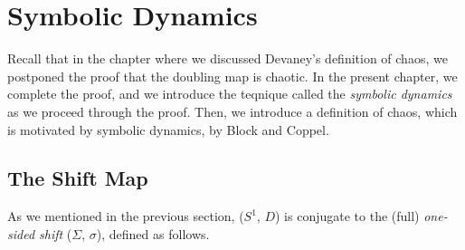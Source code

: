 \documentclass[12pt,twoside]{book}
\begin{document}
\chapter{Symbolic Dynamics}
Recall that in the chapter where we discussed Devaney's definition of chaos, we postponed the proof that the doubling map is chaotic.
In the present chapter, we complete the proof, and we introduce the teqnique called the \textit{symbolic dynamics} as we proceed through the proof.
Then, we introduce a definition of chaos, which is motivated by symbolic dynamics, by Block and Coppel.


\section{The Shift Map}
As we mentioned in the previous section, ($S^1$, $D$) is conjugate to the (full) \textit{one-sided shift} ($\Sigma$, $\sigma$), defined as follows.
\end{document}
